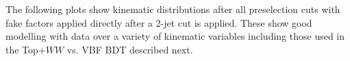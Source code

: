 The following plots show kinematic distributions after all preselection cuts with fake factors applied directly after a 2-jet cut is applied. These show good modelling with data over a variety of kinematic variables including those used in the Top$+WW$ vs. VBF BDT described next.
\begin{figure}[!h]
  \hfill
  \hfill
  \hfill
  \hfill
  \hfill
\end{figure}
